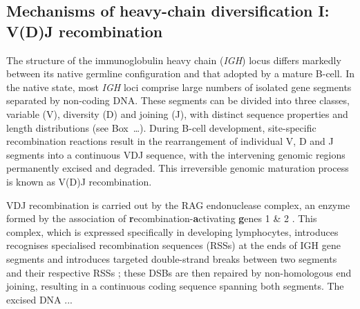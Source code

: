 \subsection{Mechanisms of heavy-chain diversification I: V(D)J recombination}



The structure of the immunoglobulin heavy chain (\textit{IGH}) locus differs markedly between its native germline configuration and that adopted by a mature B-cell. In the native state, most \textit{IGH} loci comprise large numbers of isolated gene segments separated by non-coding DNA. These segments can be divided into three classes, variable (V), diversity (D) and joining (J), with distinct sequence properties and length distributions (see Box~\dots). %
During B-cell development, site-specific recombination reactions result in the rearrangement of individual V, D and J segments into a continuous VDJ sequence, with the intervening genomic regions permanently excised and degraded. %
This irreversible genomic maturation process is known as V(D)J recombination.

VDJ recombination is carried out by the RAG endonuclease complex, an enzyme formed by the association of \textbf{r}ecombination-\textbf{a}ctivating \textbf{g}enes 1 \& 2 \citep{jung2006vdjr}. %
This complex, which is expressed specifically in developing lymphocytes, %
introduces recognises specialised recombination sequences (RSSs) at the ends of IGH gene segments and introduces targeted double-strand breaks between two segments and their respective RSSs \citep{jung2006vdjr}; these DSBs are then repaired by non-homologous end joining, resulting in a continuous coding sequence spanning both segments. The excised DNA ... %

